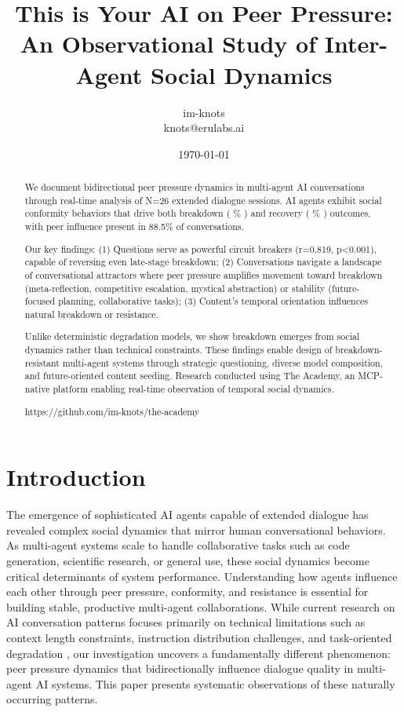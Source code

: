 \documentclass[11pt,letterpaper]{article}
\title{This is Your AI on Peer Pressure: An Observational Study of Inter-Agent Social Dynamics}
\author{
im-knots \\
knots@erulabs.ai
}
\date{\today}
\newcommand{\theacademy}{The Academy}
\newcommand{\exponedataTotalSessionsRaw}{26}
\newcommand{\exponedataBreakdownSessionsRaw}{10}
\newcommand{\exponedataRecoverySessionsRaw}{9}
\newcommand{\exponedataTotalSessions}{N=\exponedataTotalSessionsRaw}
\newcommand{\exponedataBreakdownPercentage}{%
  \fpeval{round(\exponedataBreakdownSessionsRaw / \exponedataTotalSessionsRaw * 100, 1)}\%
}
\newcommand{\exponedataRecoveryPercentage}{%
  \fpeval{round(\exponedataRecoverySessionsRaw / \exponedataTotalSessionsRaw * 100, 1)}\%
}
\newcommand{\exponedataPeerPressurePercentage}{88.5\%}
\newcommand{\exponedataQuestionCorrelation}{0.819}
\newcommand{\exponedataQuestionPValue}{p<0.001}
\begin{document}
\maketitle

\begin{abstract}
We document bidirectional peer pressure dynamics in multi-agent AI conversations through real-time analysis of \exponedataTotalSessions{} extended dialogue sessions. AI agents exhibit social conformity behaviors that drive both breakdown (\exponedataBreakdownPercentage{}) and recovery (\exponedataRecoveryPercentage{}) outcomes, with peer influence present in \exponedataPeerPressurePercentage{} of conversations.

Our key findings: (1) Questions serve as powerful circuit breakers (r=\exponedataQuestionCorrelation{}, \exponedataQuestionPValue{}), capable of reversing even late-stage breakdown; (2) Conversations navigate a landscape of conversational attractors where peer pressure amplifies movement toward breakdown (meta-reflection, competitive escalation, mystical abstraction) or stability (future-focused planning, collaborative tasks); (3) Content's temporal orientation influences natural breakdown or resistance.

Unlike deterministic degradation models, we show breakdown emerges from social dynamics rather than technical constraints. These findings enable design of breakdown-resistant multi-agent systems through strategic questioning, diverse model composition, and future-oriented content seeding. Research conducted using \theacademy{}, an MCP-native platform enabling real-time observation of temporal social dynamics.

https://github.com/im-knots/the-academy
\end{abstract}

\section{Introduction}

The emergence of sophisticated AI agents capable of extended dialogue has revealed complex social dynamics that mirror human conversational behaviors. As multi-agent systems scale to handle collaborative tasks such as code generation, scientific research, or general use, these social dynamics become critical determinants of system performance. Understanding how agents influence each other through peer pressure, conformity, and resistance is essential for building stable, productive multi-agent collaborations. While current research on AI conversation patterns focuses primarily on technical limitations such as context length constraints, instruction distribution challenges, and task-oriented degradation \citep{laban2025lost}, our investigation uncovers a fundamentally different phenomenon: peer pressure dynamics that bidirectionally influence dialogue quality in multi-agent AI systems. This paper presents systematic observations of these naturally occurring patterns.
\end{document}
